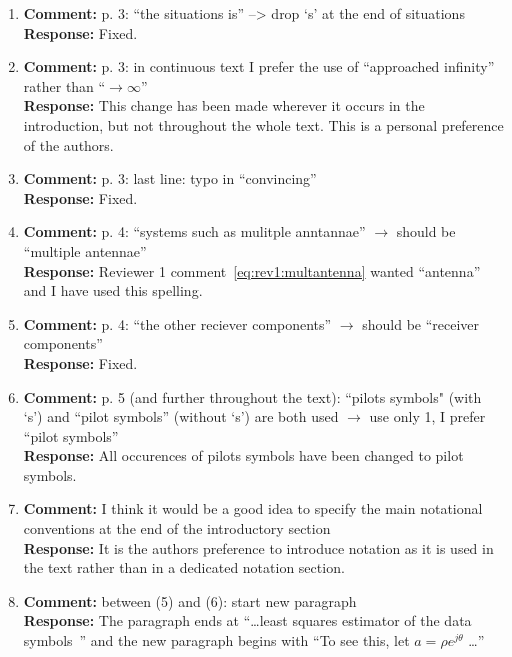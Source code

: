 \documentclass{article}
\begin{document}
\begin{enumerate}
\item \textbf{Comment:} p. 3: ``the situations is'' --> drop `s' at the end of situations \\
\textbf{Response:} Fixed.

\item \textbf{Comment:} p. 3: in continuous text I prefer the use of ``approached infinity'' rather than ``$\to \infty$'' \\
\textbf{Response:} This change has been made wherever it occurs in the introduction, but not throughout the whole text. This is a personal preference of the authors.

\item \textbf{Comment:} p. 3: last line: typo in ``convincing'' \\
\textbf{Response:} Fixed.

\item \textbf{Comment:} p. 4: ``systems such as mulitple anntannae'' $\to$ should be ``multiple antennae'' \\
\textbf{Response:} Reviewer 1 comment~\eqref{eq:rev1:multantenna} wanted ``antenna'' and I have used this spelling.

\item \textbf{Comment:} p. 4: ``the other reciever components'' $\to$ should be ``receiver components'' \\
\textbf{Response:} Fixed.

\item \textbf{Comment:} p. 5 (and further throughout the text): ``pilots symbols" (with `s') and ``pilot symbols'' (without `s') are both used $\to$ use only 1, I prefer ``pilot symbols'' \\
\textbf{Response:} All occurences of pilots symbols have been changed to pilot symbols. 

\item \label{rev2:commentnotationsection} \textbf{Comment:} I think it would be a good idea to specify the main notational conventions at the end of the introductory section \\
\textbf{Response:} It is the authors preference to introduce notation as it is used in the text rather than in a dedicated notation section. %

\item \textbf{Comment:} between (5) and (6): start new paragraph \\
\textbf{Response:} The paragraph ends at ``\dots least squares estimator of the data symbols~\cite{Sweldens2001,Mackenthun1994}'' and the new paragraph begins with ``To see this, let $a = \rho e^{j\theta}$ \dots''


\end{enumerate}
\end{document}
